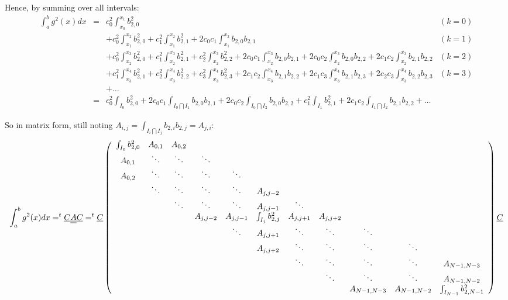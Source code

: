 \documentclass[paper=a4, fontsize=11pt]{scrartcl}
\numberwithin{equation}{section}		%
\numberwithin{figure}{section}			%
\numberwithin{table}{section}				%
\begin{document}
\begin{landscape}
Hence, by summing over all intervals:
$$
\begin{array}{llll}
\int_{a}^{b} g^2(x)dx & = & c_{0}^2\int_{x_0}^{x_{1}}b_{2,0}^2 & (k=0)\\
&& + c_{0}^2\int_{x_1}^{x_{2}}b_{2,0}^2 + c_{1}^2\int_{x_1}^{x_{2}}b_{2,1}^2 + 2c_{0}c_{1}\int_{x_1}^{x_{2}}b_{2,0}b_{2,1} & (k=1)\\
&& + c_{0}^2\int_{x_2}^{x_{3}}b_{2,0}^2 + c_{1}^2\int_{x_2}^{x_{3}}b_{2,1}^2 + c_{2}^2\int_{x_2}^{x_{3}}b_{2,2}^2 + 2c_{0}c_{1}\int_{x_2}^{x_{3}}b_{2,0}b_{2,1} + 2c_{0}c_{2}\int_{x_2}^{x_{3}}b_{2,0}b_{2,2} + 2c_{1}c_{2}\int_{x_2}^{x_{3}}b_{2,1}b_{2,2} & (k=2)\\
&& + c_{1}^2\int_{x_3}^{x_{4}}b_{2,1}^2 + c_{2}^2\int_{x_3}^{x_{4}}b_{2,2}^2 + c_{3}^2\int_{x_3}^{x_{4}}b_{2,3}^2 + 2c_{1}c_{2}\int_{x_3}^{x_{4}}b_{2,1}b_{2,2} + 2c_{1}c_{3}\int_{x_3}^{x_{4}}b_{2,1}b_{2,3} + 2c_{2}c_{3}\int_{x_3}^{x_{4}}b_{2,2}b_{2,3} & (k=3)\\
&& + \hdots &\\
& = & c_{0}^2\int_{I_0}b_{2,0}^2 + 2c_{0}c_{1}\int_{I_0\bigcap I_1}b_{2,0}b_{2,1} + 2c_{0}c_{2}\int_{I_0\bigcap I_2}b_{2,0}b_{2,2} + c_{1}^2\int_{I_1}b_{2,1}^2 + 2c_{1}c_{2}\int_{I_1\bigcap I_2}b_{2,1}b_{2,2} + \hdots&
\end{array}
$$


So in matrix form, still noting $A_{i,j} = \int_{I_i\bigcap I_j}b_{2,i}b_{2,j} = A_{j,i}$:
$$
\int_{a}^{b} g^2(x)dx = ^t\underline{C}\underline{\underline{A}}\underline{C} = ^t\underline{C} \left(\begin{array}{ccccccccccc}
\int_{I_0}b_{2,0}^2&A_{0,1}&A_{0,2}&&&&&&&&\\ A_{0,1}&\ddots&\ddots&\ddots&&&&&&&\\ A_{0,2}&\ddots&\ddots&\ddots&\ddots&&&&&&\\
&\ddots&\ddots&\ddots&\ddots&A_{j,j-2}&&&&&\\ &&\ddots&\ddots&\ddots&A_{j,j-1}&\ddots&&&&\\
&&&A_{j,j-2}&A_{j,j-1}&\int_{I_j}b_{2,j}^2&A_{j,j+1}&A_{j,j+2}&&&\\
&&&&\ddots&A_{j,j+1}&\ddots&\ddots&\ddots&&\\ &&&&&A_{j,j+2}&\ddots&\ddots&\ddots&\ddots&\\
&&&&&&\ddots&\ddots&\ddots&\ddots&A_{N-1,N-3}\\ &&&&&&&\ddots&\ddots&\ddots&A_{N-1,N-2}\\ &&&&&&&&A_{N-1,N-3}&A_{N-1,N-2}&\int_{I_{N-1}}b_{2,N-1}^2
\end{array}\right) \underline{C}\\
$$


\end{landscape}
\end{document}
